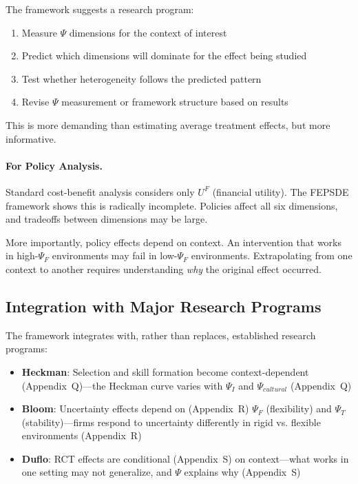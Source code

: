 The framework suggests a research program:
\begin{enumerate}
    \item Measure $\Psi$ dimensions for the context of interest
    \item Predict which dimensions will dominate for the effect being studied
    \item Test whether heterogeneity follows the predicted pattern
    \item Revise $\Psi$ measurement or framework structure based on results
\end{enumerate}

This is more demanding than estimating average treatment effects, but more informative.

\paragraph{For Policy Analysis.}
Standard cost-benefit analysis considers only $U^F$ (financial utility).
The FEPSDE framework shows this is radically incomplete.
Policies affect all six dimensions, and tradeoffs between dimensions may be large.

More importantly, policy effects depend on context. An intervention that works in high-$\Psi_F$ environments may fail in low-$\Psi_F$ environments. Extrapolating from one context to another requires understanding \emph{why} the original effect occurred.

\subsection{Integration with Major Research Programs}

The framework integrates with, rather than replaces, established research programs:

\begin{itemize}
    \item \textbf{Heckman}: Selection and skill formation become context-dependent (Appendix~Q)---the Heckman curve varies with $\Psi_I$ and $\Psi_{cultural}$ (Appendix~Q)
    
    \item \textbf{Bloom}: Uncertainty effects depend on (Appendix~R) $\Psi_F$ (flexibility) and $\Psi_T$ (stability)---firms respond to uncertainty differently in rigid vs. flexible environments (Appendix~R)
    
    \item \textbf{Duflo}: RCT effects are conditional (Appendix~S) on context---what works in one setting may not generalize, and $\Psi$ explains why (Appendix~S)
\end{itemize}

